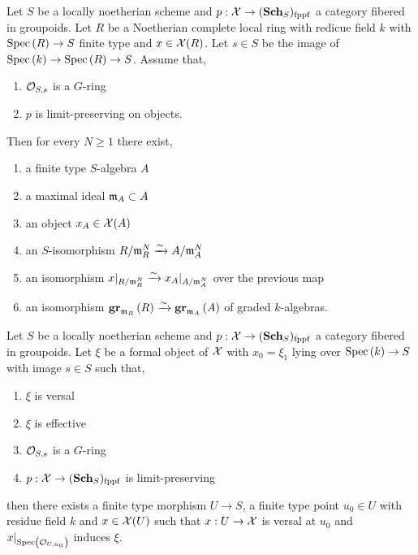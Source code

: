 \documentclass[12pt]{article}
\begin{document}
\begin{theorem}[Artin]
Let $S$ be a locally noetherian scheme and $p : \mathcal{X} \to (\mathbf{Sch}_S)_{\mathrm{fppf}}$ a category fibered in groupoids. Let $R$ be a Noetherian complete local ring with redicue field $k$ with $\mathrm{Spec}\left( R \right) \to S$ finite type and $x \in \mathcal{X}(R)$. Let $s \in S$ be the image of $\mathrm{Spec}\left( k \right) \to \mathrm{Spec}\left( R \right) \to S$. Assume that,
\begin{enumerate}
\item $\mathcal{O}_{S, s}$ is a $G$-ring
\item $p$ is limit-preserving on objects.
\end{enumerate}
Then for every $N \ge 1$ there exist,
\begin{enumerate}
\item a finite type $S$-algebra $A$
\item a maximal ideal $\mathfrak{m}_A \subset A$
\item an object $x_A \in \mathcal{X}(A)$
\item an $S$-isomorphism $R / \mathfrak{m}_R^N \xrightarrow{\sim} A / \mathfrak{m}_A^N$
\item an isomorphism $x|_{R/\mathfrak{m}_R^N} \xrightarrow{\sim} x_A |_{A / \mathfrak{m}_A^N}$ over the previous map
\item an isomorphism $\mathbf{gr}_{\mathfrak{m}_R}\left(R\right) \xrightarrow{\sim} \mathbf{gr}_{\mathfrak{m}_A}\left(A\right)$ of graded $k$-algebras.
\end{enumerate}
\end{theorem}

\begin{lemma}
Let $S$ be a locally noetherian scheme and $p : \mathcal{X} \to (\mathbf{Sch}_S)_{\mathrm{fppf}}$ a category fibered in groupoids. Let $\xi$ be a formal object of $\mathcal{X}$ with $x_0 = \xi_1$ lying over $\mathrm{Spec}\left( k \right) \to S$ with image $s \in S$ such that,
\begin{enumerate}
\item $\xi$ is versal
\item $\xi$ is effective
\item $\mathcal{O}_{S, s}$ is a $G$-ring 
\item $p : \mathcal{X} \to (\mathbf{Sch}_S)_{\mathrm{fppf}}$ is limit-preserving
\end{enumerate}
then there exists a finite type morphism $U \to S$, a finite type point $u_0 \in U$ with residue field $k$ and $x \in \mathcal{X}(U)$ such that $x : U \to \mathcal{X}$ is versal at $u_0$ and $x|_{\mathrm{Spec}\left( \mathcal{O}_{U, u_0} \right)}$ induces $\xi$. 
\end{lemma}
\end{document}
